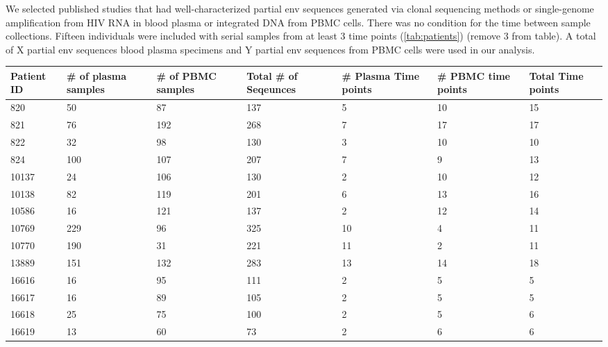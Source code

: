 We selected published studies that had well-characterized partial env sequences generated via clonal sequencing methods or single-genome amplification from HIV RNA in blood plasma or integrated DNA from PBMC cells. There was no condition for the time between sample collections. Fifteen individuals were included with serial samples from at least 3 time points (\ref{tab:patients}) (remove 3 from table). A total of X partial env sequences blood plasma specimens and Y partial env sequences from PBMC cells were used in our analysis.

\begin{table*}[!ht]\label{tab:patients} 
\def\arraystretch{1.3}%
\begin{tabularx}{\textwidth}{ X | X | X | X | X | X | X } 
\hline
\hline
Patient ID & \# of plasma samples & \# of PBMC samples & Total \# of Seqeunces & \# Plasma Time points & \# PBMC time points & Total Time points   \\ \hline \hline
820 &       50 &       87 &      137 &        5 &       10 &       15  \\
821 &       76 &      192 &      268 &        7 &       17 &       17   \\ 
822 &       32 &       98 &      130 &        3 &       10 &       10   \\ 
824 &      100 &      107 &      207 &        7 &        9 &       13   \\ 
10137 &       24 &      106 &      130 &        2 &       10 &       12  \\ 
10138 &       82 &      119 &      201 &        6 &       13 &       16  \\
10586 &       16 &      121 &      137 &        2 &       12 &       14  \\ 
10769 &      229 &       96 &      325 &       10 &        4 &       11  \\ 
10770 &      190 &       31 &      221 &       11 &        2 &       11  \\ 
13889 &      151 &      132 &      283 &       13 &       14 &       18  \\ 
16616 &       16 &       95 &      111 &        2 &        5 &        5  \\ 
16617 &       16 &       89 &      105 &        2 &        5 &        5  \\ 
16618 &       25 &       75 &      100 &        2 &        5 &        6  \\ 
16619 &       13 &       60 &       73 &        2 &        6 &        6  \\ 

\end{tabularx}
\end{table*}
